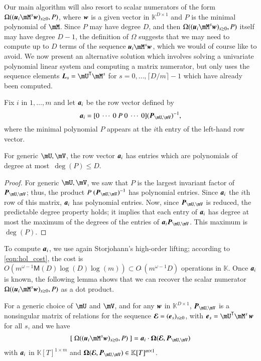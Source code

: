 \documentclass[final,1p,times,authoryear]{elsarticle}
\newcommand{\var}{T} %
\newcommand{\mat}[1]{\bm{\MakeUppercase{#1}}} %
\newcommand{\row}[1]{\bm{\MakeLowercase{#1}}} %
\newcommand{\col}[1]{\bm{\MakeLowercase{#1}}} %
\newcommand{\softO}[1]{O{\tilde{~}}(#1)} %
\newcommand{\minpoly}{P}
\newcommand{\trsp}[1]{#1^{\mathsf{T}}} %
\def\M {\ensuremath{\mathsf{M}}}
\def\K{\mathbb{K}}
\def\K {\ensuremath{\mathbb{K}}}
\newcommand{\mUt}{\trsp{\mU}}
\begin{document}
Our main algorithm will also resort to scalar numerators of
the form $\Omega((\row{u}_i \mM^s \col{w})_{s \ge 0},
\minpoly)$, where $\row{w}$ is a given vector in $\K^{D \times 1}$ and
$\minpoly$ is the minimal polynomial of $\mM$. Since $\minpoly$ may
have degree $D$, and then $\Omega((\row{u}_i \mM^s \col{w})_{s \ge 0},
\minpoly)$ itself may have degree $D-1$,
the definition of $\Omega$ suggests that we
may need to compute up to $D$ terms of the sequence $\row{u}_i \mM^s
\col{w}$, which we would of course like to avoid. We now present an
alternative solution which involves solving a univariate polynomial linear system
and computing a matrix numerator, but only uses the sequence elements
$\mat{L}_s= \mUt \mM^s$ for $s=0,\dots,\lceil D/m \rceil-1$
which have already been computed.

Fix $i$ in $1,\dots,m$ and let $\row{a}_i$ be the row vector defined
by $$\row{a}_i =[0~\cdots~0~\minpoly~0~\cdots~0]  (\mat{P}_{\mU,\mV})^{-1} ,$$
where the minimal polynomial $\minpoly$ appears at the $i$th entry  of the
left-hand row vector. 
\begin{lemma}\label{utilde}
  For generic $\mU,\mV$, the row vector $\row{a}_i$ has entries which are
  polynomials of degree at most~$\deg(P) \le D$.
\end{lemma}
\begin{proof}
  For generic $\mU,\mV$, we saw that $\minpoly$ is the largest invariant factor
  of $ \mat{P}_{\mU,\mV}$; thus, the product $\minpoly\
  (\mat{P}_{\mU,\mV})^{-1}$ has polynomial entries. Since $\row{a}_i$ the $i$th
  row of this matrix, $\row{a}_i$ has polynomial entries.  Now, since
  $\mat{P}_{\mU,\mV}$ is reduced, the predictable degree property
  \citep[Theorem~6.3-13]{Kailath80} holds; it implies that each entry of
  $\row{a}_i$ has degree at most the maximum of the degrees of the entries of
  $\row{a}_i\mat{P}_{\mU,\mV}$. This maximum is $\deg(\minpoly)$.
\end{proof}
To compute $\row{a}_i$, we use again Storjohann's high-order lifting;
according to \cref{eqn:hol_cost}, the cost is $ O(m^{\omega-1} \M(D)
\log(D) \log(m)) \subset \softO{m^{\omega-1}D}$ operations in $\K$.
Once $\row{a}_i$ is known, the following lemma shows that we can
recover the scalar numerator $\Omega((\row{u}_i \mM^s \col{w})_{s \ge
0}, \minpoly)$ as a dot product.
\begin{lemma}\label{lemma:omegaOmega}
  For a generic choice of $\mU$ and $\mV$, and for any $\col{w}$ in
  $\K^{D \times 1}$, $ \mat{P}_{\mU,\mV}$ is a nonsingular matrix of
  relations for the sequence $\mat{\mathcal{E}} =
  (\col{e}_s)_{s\ge0}$, with $\col{e}_s=\mUt \mM^s\, \col{w}$
  for all $s$, and we have
  \begin{align}\label{eq:OmegaOmega}
    [~\Omega((\row{u}_i \mM^s \col{w})_{s \ge 0}, \minpoly)~] = \row{a}_i\cdot \mat{\Omega}(\mat{\mathcal{E}}, \mat{P}_{\mU,\mV})
  \end{align}
  with $\row{a}_i$ in $\K[\var]^{1 \times m}$ and 
  $\mat{\Omega}(\mat{\mathcal{E}} , \mat{P}_{\mU,\mV}) \in \K[\var]^{m \times 1}$.
\end{lemma}
\end{document}
